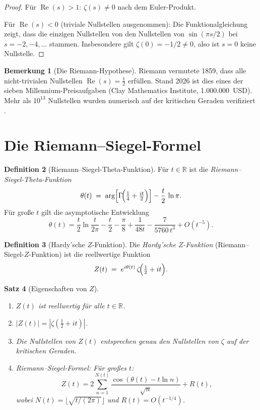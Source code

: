 \documentclass[12pt,a4paper]{amsart}
\newtheorem{theorem}{Satz}[section]
\theoremstyle{definition}
\newtheorem{definition}[theorem]{Definition}
\newtheorem{remark}[theorem]{Bemerkung}
\newcommand{\R}{\mathbb{R}}
\DeclareMathOperator{\Re}{Re}
\begin{document}
\begin{proof}
F\"ur $\Re(s) > 1$: $\zeta(s) \ne 0$ nach dem Euler-Produkt.

F\"ur $\Re(s) < 0$ (triviale Nullstellen ausgenommen): Die Funktionalgleichung
zeigt, dass die einzigen Nullstellen von den Nullstellen von $\sin(\pi s/2)$
bei $s = -2, -4, \ldots$ stammen.
Insbesondere gilt $\zeta(0) = -1/2 \ne 0$, also ist $s=0$ keine Nullstelle.
\end{proof}

\begin{remark}[Die Riemann-Hypothese]
\label{rem:rh}
Riemann vermutete 1859, dass alle nicht-trivialen Nullstellen
$\Re(s) = \tfrac{1}{2}$ erf\"ullen.
Stand 2026 ist dies eines der sieben Millennium-Preisaufgaben
(Clay Mathematics Institute, 1.000.000~USD).
Mehr als $10^{13}$ Nullstellen wurden numerisch auf der kritischen
Geraden verifiziert \cite{Platt2021}.
\end{remark}

\section{Die Riemann--Siegel-Formel}

\begin{definition}[Riemann--Siegel-Theta-Funktion]
\label{def:theta}
F\"ur $t \in \R$ ist die \emph{Riemann--Siegel-Theta-Funktion}
\[
  \theta(t) \;=\; \arg\!\left[\Gamma\!\Bigl(\tfrac{1}{4} + \tfrac{it}{2}\Bigr)\right]
  - \frac{t}{2}\,\ln\pi.
\]
F\"ur gro\ss e $t$ gilt die asymptotische Entwicklung
\[
  \theta(t) = \frac{t}{2}\ln\frac{t}{2\pi} - \frac{t}{2} - \frac{\pi}{8}
  + \frac{1}{48t} - \frac{7}{5760\,t^3} + O(t^{-5}).
\]
\end{definition}

\begin{definition}[Hardy'sche $Z$-Funktion]
\label{def:Z_function}
Die \emph{Hardy'sche $Z$-Funktion} (Riemann--Siegel-$Z$-Funktion) ist
die reellwertige Funktion
\[
  Z(t) \;=\; e^{i\theta(t)}\,\zeta\!\Bigl(\tfrac{1}{2} + it\Bigr).
\]
\end{definition}

\begin{theorem}[Eigenschaften von $Z$]
\label{thm:Z_properties}
\begin{enumerate}
  \item[\textup{(i)}] $Z(t)$ ist reellwertig f\"ur alle $t \in \R$.
  \item[\textup{(ii)}] $|Z(t)| = |\zeta(\tfrac{1}{2} + it)|$.
  \item[\textup{(iii)}] Die Nullstellen von $Z(t)$ entsprechen genau
    den Nullstellen von $\zeta$ auf der kritischen Geraden.
  \item[\textup{(iv)}] Riemann--Siegel-Formel: F\"ur gro\ss es $t$:
    \[
      Z(t) = 2\sum_{n=1}^{N(t)} \frac{\cos(\theta(t) - t\ln n)}{\sqrt{n}}
      + R(t),
    \]
    wobei $N(t) = \lfloor\sqrt{t/(2\pi)}\rfloor$ und $R(t) = O(t^{-1/4})$.
\end{enumerate}
\end{theorem}
\end{document}

